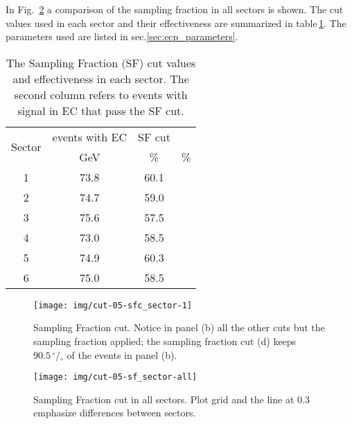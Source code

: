 In Fig.~\ref{fig:ecp_all_sectors} a comparison of the sampling fraction in all sectors is shown.
The cut values used in each sector and their effectiveness are summarized in
table\,\ref{tab:sfcut}. The parameters used are listed in sec.\ref{sec:ecp_parameters}.

\begin{table}[h]
    \label{tab:sfcut}
    \begin{center}
        \begin{tabular}{c | c | c | c}
            \hline
            \multirow{2}{*}{Sector}
            & events with EC & SF cut \\
            & GeV & \% & \% \\
            \hline
            1 & 73.8 & 60.1 \\
            2 & 74.7 & 59.0 \\
            3 & 75.6 & 57.5 \\
            4 & 73.0 & 58.5 \\
            5 & 74.9 & 60.3 \\
            6 & 75.0 & 58.5 \\
            \hline
        \end{tabular}
        \caption{The Sampling Fraction (SF) cut values and effectiveness in each sector.
        The second column refers to events with signal in EC that pass the SF cut.}
    \end{center}
\end{table}


\begin{figure}[ht]
    \centering
    \texttt{[image: img/cut-05-sfc\_sector-1]}
    \caption{Sampling Fraction cut. Notice in panel (b) all the other cuts
    but the sampling fraction applied; the sampling fraction cut (d) keeps
        $90.5\,^{\circ\!\!}/\!_\circ$ of the events in panel (b).}
    \label{fig:sampling_fractioncut_s1}
\end{figure}

\clearpage

\begin{figure}[ht]
    \vspace{-1.3cm}
    \centering
    \texttt{[image: img/cut-05-sf\_sector-all]}
    \caption{Sampling Fraction cut in all sectors. Plot grid and
    the line at 0.3 emphasize differences between sectors.}
    \label{fig:ecp_all_sectors}
\end{figure}


